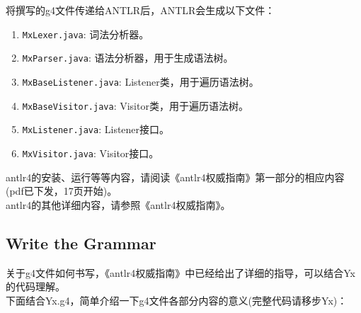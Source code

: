 将撰写的g4文件传递给ANTLR后，ANTLR会生成以下文件：
\begin{enumerate}
    \item \texttt{MxLexer.java}: 词法分析器。
    \item \texttt{MxParser.java}: 语法分析器，用于生成语法树。
    \item \texttt{MxBaseListener.java}: Listener类，用于遍历语法树。
    \item \texttt{MxBaseVisitor.java}: Visitor类，用于遍历语法树。
    \item \texttt{MxListener.java}: Listener接口。
    \item \texttt{MxVisitor.java}: Visitor接口。
\end{enumerate}


antlr4的安装、运行等等内容，请阅读《antlr4权威指南》第一部分的相应内容(pdf已下发，17页开始)。\\

antlr4的其他详细内容，请参照《antlr4权威指南》。

\subsection{Write the Grammar}
关于g4文件如何书写，《antlr4权威指南》中已经给出了详细的指导，可以结合Yx的代码理解。\\

下面结合Yx.g4，简单介绍一下g4文件各部分内容的意义(完整代码请移步Yx)：\\

